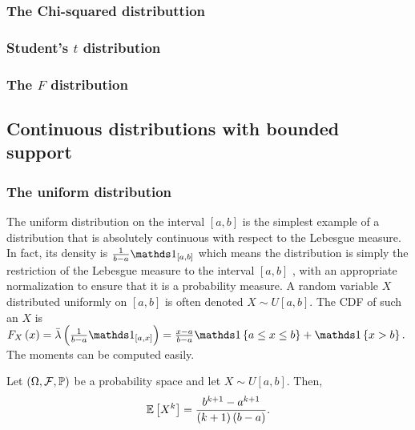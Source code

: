 \subsubsection{The Chi-squared distributtion}

\subsubsection{Student's $t$ distribution}

\subsubsection{The $F$ distribution}

\subsection{Continuous distributions with bounded support}

\subsubsection{The uniform distribution\label{subsec:uniformDistribution}}

The uniform distribution on the interval $\left[a,b\right]$ is the
simplest example of a distribution that is absolutely continuous with
respect to the Lebesgue measure. In fact, its density is $\frac{1}{b-a}\indicate_{\left[a,b\right]}$
which means the distribution is simply the restriction of the Lebesgue
measure to the interval $\left[a,b\right]$ , with an appropriate
normalization to ensure that it is a probability measure. A random
variable $X$ distributed uniformly on $\left[a,b\right]$ is often
denoted $X\sim U\left[a,b\right]$. The CDF of such an $X$ is $F_{X}\left(x\right)=\lebInt{\lambda}{\frac{1}{b-a}\indicate_{\left[a,x\right]}}=\frac{x-a}{b-a}\indicate\left\{ a\leq x\leq b\right\} +\indicate\left\{ x>b\right\} .$
The moments can be computed easily.
\begin{prop}
\label{prop:momentsUniformDistribution}Let $\left(\Omega,\mathcal{F},\mathbb{\mathbb{\mathbb{P}}}\right)$ be
a probability space and let $X\sim U\left[a,b\right]$. Then,
\begin{align*}
\mathbb{E}\left[X^{k}\right] & =\frac{b^{k+1}-a^{k+1}}{(k+1)\left(b-a\right)}.\\
\end{align*}
\end{prop}


